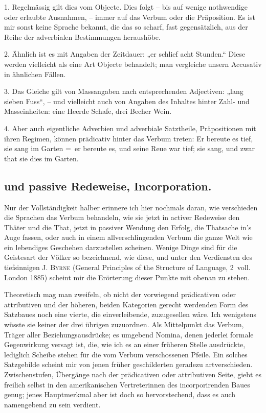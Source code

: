 1. Regelmässig gilt dies vom Objecte. Dies folgt – bis auf wenige nothwendige oder erlaubte Ausnahmen, – immer auf das Verbum oder die Präposition. Es ist mir sonst keine Sprache bekannt, die das  so scharf, fast gegensätzlich, aus der Reihe der adverbialen Bestimmungen heraushöbe.

2. Ähnlich ist es mit Angaben der Zeitdauer: „er schlief acht Stunden.“ Diese werden vielleicht als eine Art Objecte behandelt; man vergleiche unsern Accusativ in ähnlichen Fällen.

3. Das Gleiche gilt von Massangaben nach entsprechenden Adjectiven: „lang sieben Fuss“, – und vielleicht auch von Angaben des Inhaltes hinter Zahl- und Masseinheiten: eine Heerde Schafe, drei Becher Wein.

4. Aber auch eigentliche Adverbien und adverbiale Satztheile, Präpositionen mit ihren Regimen, können prädicativ hinter das Verbum treten: Er bereute es tief, sie sang im Garten =~er bereute es, und seine Reue war tief; sie sang, und zwar that sie dies im Garten.
\subsection*{ und passive Redeweise, Incorporation.}\label{IV.IV.Icepsilon} 

Nur der Vollständigkeit halber erinnere ich hier nochmals daran, wie verschieden die Sprachen das Verbum behandeln, wie sie jetzt in activer Redeweise den Thäter und die That, jetzt in passiver Wendung den Erfolg, die Thatsache in’s Auge fassen, oder auch in einem allverschlingenden Verbum die ganze Welt wie ein lebendiges Geschehen darzustellen scheinen. Wenige Dinge sind für die Geistesart der Völker so \label{fp.439} bezeichnend, wie diese, und unter den Verdiensten des tiefsinnigen J. \textsc{Byrne} (General Principles of the Structure of Language, 2~voll. London 1885) scheint mir die Erörterung dieser Punkte mit obenan zu stehen.

Theoretisch mag man zweifeln, ob nicht der vorwiegend prädicativen oder attributiven und der höheren, beiden Kategorien gerecht werdenden Form des Satzbaues noch eine vierte, die einverleibende, zuzugesellen wäre. Ich wenigstens wüsste sie keiner der drei übrigen zuzuordnen. Als Mittelpunkt das Verbum, Träger aller Beziehungsausdrücke; es umgebend Nomina, denen jederlei formale Gegenwirkung versagt ist, die, wie ich es an einer früheren Stelle ausdrückte, lediglich Scheibe stehen für die vom Verbum verschossenen Pfeile. Ein solches Satzgebilde scheint mir von jenen früher geschilderten geradezu artverschieden. \label{sp.460} Zwischenstufen, Übergänge nach der prädicativen oder attributiven Seite, giebt es freilich selbst in den amerikanischen Vertreterinnen des incorporirenden Baues genug; jenes Hauptmerkmal aber ist doch so hervorstechend, dass es auch namengebend zu sein verdient.

